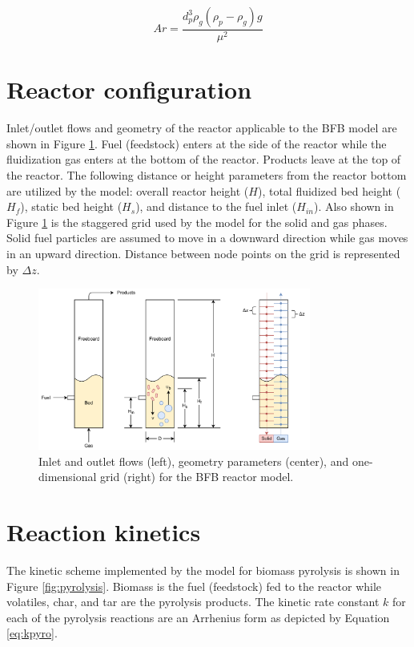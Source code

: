 \documentclass[12pt]{article}
\begin{document}
\begin{equation}\label{eq:archimedes}
    Ar = \frac{d_p^3 \rho_g (\rho_p - \rho_g) g}{\mu^2}
\end{equation}

\section{Reactor configuration}

Inlet/outlet flows and geometry of the reactor applicable to the BFB model are shown in Figure \ref{fig:grid}. Fuel (feedstock) enters at the side of the reactor while the fluidization gas enters at the bottom of the reactor. Products leave at the top of the reactor. The following distance or height parameters from the reactor bottom are utilized by the model: overall reactor height ($H$), total fluidized bed height ($H_f$), static bed height ($H_{s}$), and distance to the fuel inlet ($H_{in}$). Also shown in Figure \ref{fig:grid} is the staggered grid used by the model for the solid and gas phases. Solid fuel particles are assumed to move in a downward direction while gas moves in an upward direction. Distance between node points on the grid is represented by $\Delta z$.

\begin{figure}[ht]
    \centering
    \includegraphics[width=0.8\textwidth]{figures/grid.pdf}
    \caption{Inlet and outlet flows (left), geometry parameters (center), and one-dimensional grid (right) for the BFB reactor model.}
    \label{fig:grid}
\end{figure}

\section{Reaction kinetics}

The kinetic scheme implemented by the model for biomass pyrolysis is shown in Figure \ref{fig:pyrolysis}. Biomass is the fuel (feedstock) fed to the reactor while volatiles, char, and tar are the pyrolysis products. The kinetic rate constant $k$ for each of the pyrolysis reactions are an Arrhenius form as depicted by Equation \ref{eq:kpyro}.
\end{document}
